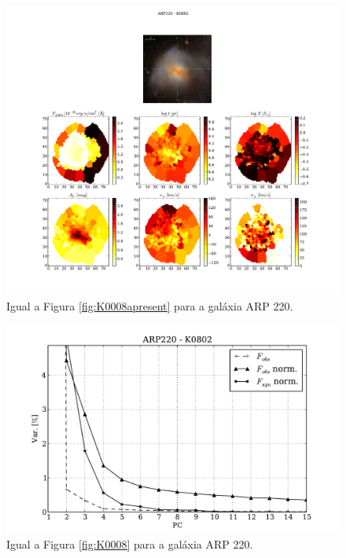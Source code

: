 \begin{figure}
    \includegraphics[width=1.\textwidth]{figuras/K0802-apresent.pdf}
    \caption[Propriedades f\'isicas da gal\'axia ARP 220.]
    {Igual a Figura \ref{fig:K0008apresent} para a galáxia ARP 220.}
    \label{fig:K0802apresent}
\end{figure}

\begin{figure}
    \includegraphics[height=0.33\textheight]{figuras/K0802-screetest.pdf}
    \caption[Scree test comparativo entre 3 PCAs - ARP 220.]
	{Igual a Figura \ref{fig:K0008} para a galáxia ARP 220.}
    \label{fig:K0802scree}
\end{figure}

